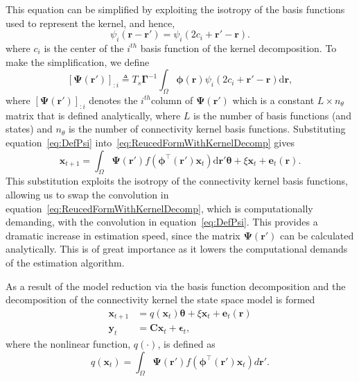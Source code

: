 \documentclass[]{article}
\begin{document}
This equation can be simplified by exploiting the isotropy of the basis functions used to represent the kernel, and hence,
\begin{equation}
	\psi_i (\mathbf{r}-\mathbf{r}') = \psi_i (2c_i+\mathbf{r}'-\mathbf{r}).
\end{equation}
where $c_i$ is the center of the $i^{th}$ basis function of the kernel decomposition. To make the simplification, we define
\begin{equation}\label{eq:DefPsi}
	\left[ \boldsymbol\Psi(\mathbf{r}')\right]_{:i}  \triangleq T_s\boldsymbol{\Gamma}^{-1}\int_\Omega {\boldsymbol{\phi}(\mathbf{r})\psi_i (2c_i+\mathbf{r}'-\mathbf{r})\textrm{d}\mathbf{r}},
\end{equation}
where $\left[ \boldsymbol\Psi(\mathbf{r}')\right]_{:i}$ denotes the $i^{th}$column of $\boldsymbol{\Psi}(\mathbf{r}')$ which is a constant $L \times n_{\theta}$ matrix that is defined analytically, where $L$ is the number of basis functions (and states) and $n_{\theta}$ is the number of connectivity kernel basis functions. Substituting equation~\ref{eq:DefPsi} into~\ref{eq:ReucedFormWithKernelDecomp} gives
\begin{equation}
	\mathbf{x}_{t+1} = \int_\Omega \boldsymbol{\Psi}(\mathbf{r}') f(\boldsymbol{\phi}^{\top}(\mathbf{r}')\mathbf{x}_t) \textrm{d}\mathbf{r}' \boldsymbol{\theta} + \xi\mathbf{x}_t 
+ \mathbf{e}_t(\mathbf{r}).
\end{equation}
This substitution exploits the isotropy of the connectivity kernel basis functions, allowing us to swap the convolution in equation~\ref{eq:ReucedFormWithKernelDecomp}, which is computationally demanding, with the convolution in equation~\ref{eq:DefPsi}. This provides a dramatic increase in estimation speed, since the matrix $\boldsymbol\Psi(\mathbf{r}')$ can be calculated analytically. This is of great importance as it lowers the computational demands of the estimation algorithm.

As a result of the model reduction via the basis function decomposition and the decomposition of the connectivity kernel the state space model is formed
\begin{align}
 \mathbf x_{t+1}&=q(\mathbf x_t)\boldsymbol\theta+\xi \mathbf x_t+\boldsymbol e_t(\mathbf r) \\
 \mathbf y_t&=\mathbf C \mathbf x_t+\boldsymbol \epsilon_t,
\end{align}
where the nonlinear function, $q(\cdot)$, is defined as
\begin{equation}\label{eq:QmatrixForSigmapoints}
	q(\mathbf{x}_t) = \int_\Omega \boldsymbol{\Psi}(\mathbf{r}') f(\boldsymbol{\phi}^{\top}(\mathbf{r}')\mathbf{x}_t) d\mathbf{r}'.
\end{equation}
\end{document}
